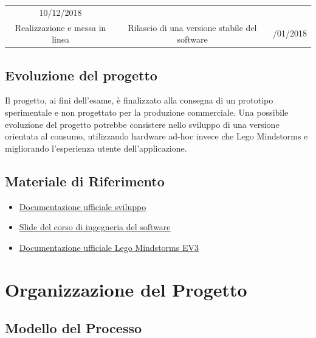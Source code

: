 \documentclass{article}
\begin{document}
\begin{longtable}[]{@{}ccc@{}}
\begin{minipage}[t]{0.13\columnwidth}
10/12/2018\strut
\end{minipage}\tabularnewline
\begin{minipage}[t]{0.31\columnwidth}\centering
Realizzazione e messa in linea\strut
\end{minipage} & \begin{minipage}[t]{0.47\columnwidth}\centering
Rilascio di una versione stabile del software\strut
\end{minipage} & \begin{minipage}[t]{0.13\columnwidth}\centering
31/01/2018\strut
\end{minipage}\tabularnewline
\bottomrule
\end{longtable}

\subsection{Evoluzione del progetto}

Il progetto, ai fini dell'esame, è finalizzato alla consegna di un prototipo sperimentale e non progettato per la produzione commerciale. Una possibile evoluzione del progetto potrebbe consistere nello sviluppo di una versione orientata al consumo, utilizzando hardware ad-hoc invece che Lego Mindstorms e migliorando l'esperienza utente dell'applicazione.

\subsection{Materiale di Riferimento}

\begin{itemize}
\item \href{http://developer.android.com}{Documentazione ufficiale sviluppo}
\item \href{https://www.unive.it/data/insegnamento/89084}{Slide del corso di ingegneria del software}
\item \href{https://le-www-live-s.legocdn.com/ev3/userguide/1.4.0/ev3\_userguide\_enus.pdf}{Documentazione ufficiale Lego Mindstorms EV3}
\end{itemize}

\section{Organizzazione del Progetto}

\subsection{Modello del Processo}
\end{document}
